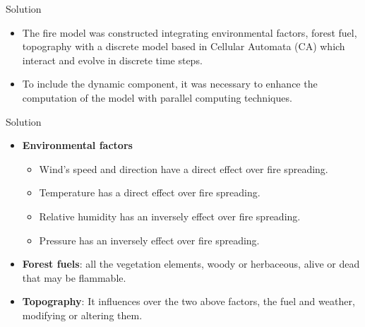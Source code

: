 \documentclass{beamer}
\begin{document}
      \begin{frame}{Solution}
        \begin{itemize}
          \item<1-> The fire model was constructed integrating environmental factors, forest 
            fuel, topography with a discrete model based in Cellular Automata (CA) which interact 
            and evolve in discrete time steps.
          \item<2-> To include the dynamic component, it was necessary to enhance 
            the computation of the model with parallel computing techniques.
        \end{itemize}
      \end{frame}
      
      \begin{frame}{Solution}
        \begin{itemize}
          \item<1-> \textbf{Environmental factors}
            \begin{itemize}
              \item<1-> Wind's speed and direction have a direct effect over fire spreading.
              \item<2-> Temperature has a direct effect over fire spreading.
              \item<3-> Relative humidity has an inversely effect over fire spreading.
              \item<4-> Pressure has an inversely effect over fire spreading.
            \end{itemize}
          \item<5-> \textbf{Forest fuels}: all the vegetation elements, woody or herbaceous, 
            alive or dead that may be flammable.
          \item<6-> \textbf{Topography}: It influences over the two above factors, the fuel and weather,
            modifying or altering them.
        \end{itemize}
      \end{frame}
      
\end{document}
